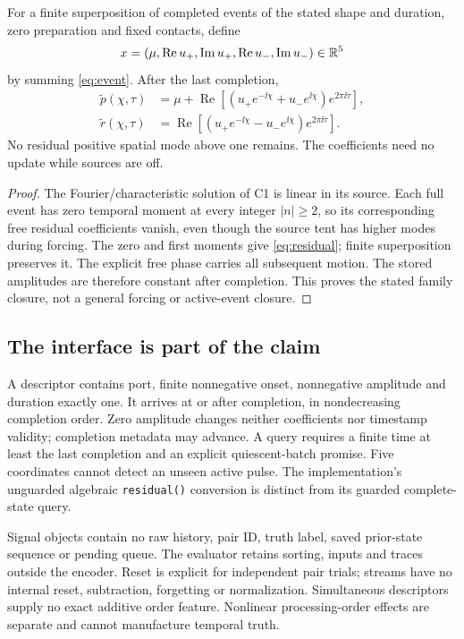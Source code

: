\begin{theorem}\label{thm:closure}
For a finite superposition of completed events of the stated shape and duration, zero preparation and fixed contacts, define
\[
x=(\mu,\operatorname{Re}u_+,\operatorname{Im}u_+,\operatorname{Re}u_-,\operatorname{Im}u_-)\in\mathbb R^5
\]
by summing \eqref{eq:event}. After the last completion,
\begin{equation}\label{eq:residual}
 \begin{aligned}
 \widetilde p(\chi,\tau)&=\mu+\operatorname{Re}
 [(u_+e^{-\ii\chi}+u_-e^{\ii\chi})e^{2\pi\ii\tau}],\\
 \widetilde r(\chi,\tau)&=\operatorname{Re}
 [(u_+e^{-\ii\chi}-u_-e^{\ii\chi})e^{2\pi\ii\tau}].
 \end{aligned}
\end{equation}
No residual positive spatial mode above one remains. The coefficients need no update while sources are off.
\end{theorem}
\begin{proof}
The Fourier/characteristic solution of C1 is linear in its source. Each full event has zero temporal moment at every integer $|n|\ge2$, so its corresponding free residual coefficients vanish, even though the source tent has higher modes during forcing. The zero and first moments give \eqref{eq:residual}; finite superposition preserves it. The explicit free phase carries all subsequent motion. The stored amplitudes are therefore constant after completion. This proves the stated family closure, not a general forcing or active-event closure.
\end{proof}

\subsection{The interface is part of the claim}
A descriptor contains port, finite nonnegative onset, nonnegative amplitude and duration exactly one. It arrives at or after completion, in nondecreasing completion order. Zero amplitude changes neither coefficients nor timestamp validity; completion metadata may advance. A query requires a finite time at least the last completion and an explicit quiescent-batch promise. Five coordinates cannot detect an unseen active pulse. The implementation's unguarded algebraic \texttt{residual()} conversion is distinct from its guarded complete-state query.

Signal objects contain no raw history, pair ID, truth label, saved prior-state sequence or pending queue. The evaluator retains sorting, inputs and traces outside the encoder. Reset is explicit for independent pair trials; streams have no internal reset, subtraction, forgetting or normalization. Simultaneous descriptors supply no exact additive order feature. Nonlinear processing-order effects are separate and cannot manufacture temporal truth.

